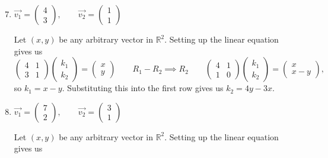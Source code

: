 \documentclass{article}
\begin{document}
\begin{enumerate}
    \setcounter{enumi}{6}
    \item \(\overrightarrow{v_1} = \begin{pmatrix}
        4\\3
    \end{pmatrix},\qquad\overrightarrow{v_2} = \begin{pmatrix}
        1\\1
    \end{pmatrix}\)\begin{solution}
        Let \((x,y)\) be any arbitrary vector in \(\mathbb{R}^2\). Setting up the linear equation gives us\[
            \begin{pmatrix}
                4&1\\3&1
            \end{pmatrix} \begin{pmatrix}
                k_1\\k_2
            \end{pmatrix} = \begin{pmatrix}
                x\\y
            \end{pmatrix} \qquad R_1 - R_2 \implies R_2 \qquad \begin{pmatrix}
                4&1 \\ 1&0 
            \end{pmatrix} \begin{pmatrix}
                k_1\\k_2
            \end{pmatrix} = \begin{pmatrix}
                x \\x-y
            \end{pmatrix},
        \] so \(k_1 = x-y\). Substituting this into the first row gives us \(k_2 = 4y - 3x\). 
    \end{solution}
    \item \(\overrightarrow{v_1} = \begin{pmatrix}
        7\\2
    \end{pmatrix},\qquad\overrightarrow{v_2} = \begin{pmatrix}
        3\\1
    \end{pmatrix}\)\begin{solution}
        Let \((x,y)\) be any arbitrary vector in \(\mathbb{R}^2\). Setting up the linear equation gives us\[
\]
\end{solution}
\end{enumerate}
\end{document}

